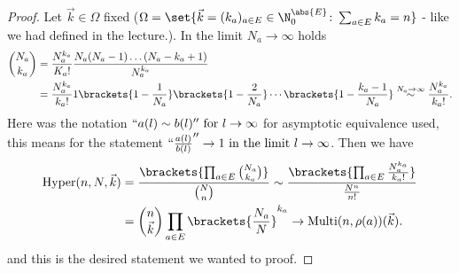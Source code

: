 \begin{proof}
	Let $\vec{k} \in \Omega$ fixed ($\Omega = \set{\vec{k} = (k_a)_{a \in E} \in \N_0^{\abs{E}}\colon \sum_{a \in E} k_a = n}$ - like we had defined in the lecture.). In the limit $N_a \to \infty$ holds
	\begin{align*}
		\binom{N_a}{k_a} &= \frac{N_a^{k_a}}{K_a !} \frac{N_a(N_a -1)\dots (N_a - k_a +1)}{N_a^{k_a}}\\
		&= \frac{N_a^{k_a}}{k_a !} 1\brackets{1 - \frac{1}{N_a}}\brackets{1 - \frac{2}{N_a}}\cdots \brackets{1 - \frac{k_a -1}{N_a}} \overset{N_a \to \infty}{\sim} \frac{N_a^{k_a}}{k_a !}.
	\end{align*}
	Here was the notation $``a(l) \sim b(l)'' \text{ for } l \to \infty$ for asymptotic equivalence used, this means for the statement $``\frac{a(l)}{b(l)}'' \to 1 \text{ in the limit } l \to \infty$. Then we have
	\begin{align*}
		\Hyper(n,N,\vec{k}) 
		&= \frac{\brackets{\prod_{a \in E} 
		\binom{N_a}{k_a}}}{\binom{N}{n}}
		\sim \frac{
				   \brackets{
                             \prod_{a \in E} \frac{N_a^{k_a}}
                             {k_a !}
                         }}{\frac{N^n}{n!}}\\
		&= \binom{n}{\vec{k}} \prod_{a \in E} \brackets{\frac{N_a}{N}}^{k_a} \to \Multi(n,\rho(a))(\vec{k}).
	\end{align*} 
	and this is the desired statement we wanted to proof.
\end{proof}
\subsection{}

